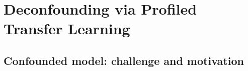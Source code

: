 \documentclass[12pt]{article}
\begin{document}
\section{Deconfounding via Profiled Transfer Learning}
\label{sec:methodology}
\subsection{Confounded model: challenge and motivation}
\label{subsec:preliminary}

\end{document}
